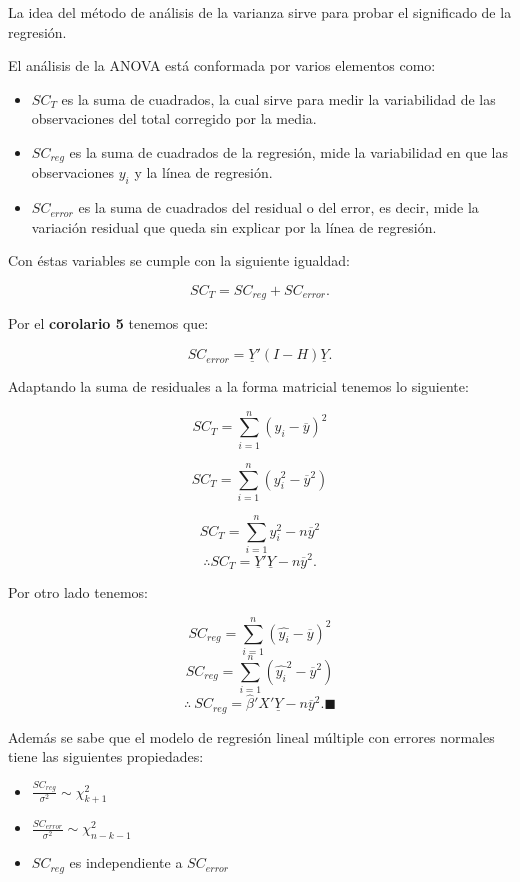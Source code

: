 \documentclass[
  a4paper,
  oneside,
  openany]{book}
\begin{document}
La idea del método de análisis de la varianza sirve para probar el significado de la regresión.

El análisis de la ANOVA está conformada por varios elementos como:

\begin{itemize}
\item
  \(SC_{T}\) es la suma de cuadrados, la cual sirve para medir la variabilidad de las observaciones del total corregido por la media.
\item
  \(SC_{reg}\) es la suma de cuadrados de la regresión, mide la variabilidad en que las observaciones \(y_{i}\) y la línea de regresión.
\item
  \(SC_{error}\) es la suma de cuadrados del residual o del error, es decir, mide la variación residual que queda sin explicar por la línea de regresión.
\end{itemize}

Con éstas variables se cumple con la siguiente igualdad:

\[SC_{T}=SC_{reg}+SC_{error}.\]

Por el \textbf{corolario 5} tenemos que:

\[SC_{error}=\underline{Y}'(I-H)\underline{Y}.\]

Adaptando la suma de residuales a la forma matricial tenemos lo siguiente:

\[SC_{T}=\sum_{i=1}^{n}(y_{i}-\overline{y})^2\]

\[SC_{T}=\sum_{i=1}^{n}(y_{i}^2-\overline{y}^2)\]

\[SC_{T}=\sum_{i=1}^{n}y_{i}^2-n\overline{y}^2\]
\[\therefore SC_{T}=\underline{Y}'\underline{Y}-n\overline{y}^2.\]

Por otro lado tenemos:

\[SC_{reg}=\sum_{i=1}^{n}(\hat{y_{i}}-\overline{y})^2\]
\[SC_{reg}=\sum_{i=1}^{n}(\hat{y_{i}}^2-\overline{y}^2)\]
\[\therefore \  SC_{reg}=\hat{\beta}'X'\underline{Y}-n\overline{y}^2. \blacksquare \]

Además se sabe que el modelo de regresión lineal múltiple con errores normales tiene las siguientes propiedades:

\begin{itemize}
\item
  \(\frac{SC_{reg}}{\sigma^2} \sim \chi^2_{k+1}\)
\item
  \(\frac{SC_{error}}{\sigma^2} \sim \chi^2_{n-k-1}\)
\item
  \(SC_{reg}\) es independiente a \(SC_{error}\)
\end{itemize}
\end{document}
